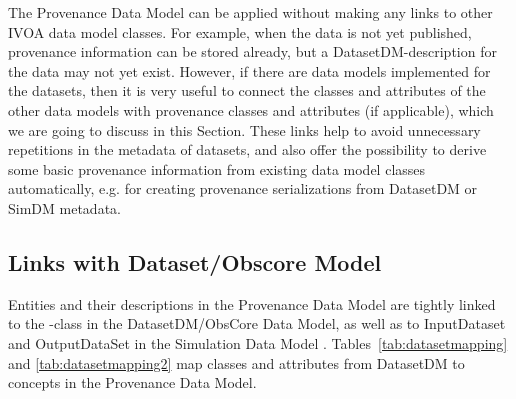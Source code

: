 
The Provenance Data Model can be applied without making any links to other 
IVOA data model classes. For example, when the data is not yet published, provenance information
can be stored already, but a DatasetDM-description for the data may not yet exist.
However, if there are data models implemented for the datasets, then it is 
very useful to connect the classes and attributes of the other data models with provenance classes and attributes (if applicable), which we are going to discuss in this Section. These links help to avoid 
unnecessary repetitions in the metadata of datasets, and also offer the possibility 
to derive some basic provenance information from existing data model classes automatically, e.g. for creating provenance serializations from DatasetDM or SimDM metadata.


\subsection{Links with Dataset/Obscore Model}
\label{sec:dataset-obscore}

Entities and their descriptions in the Provenance Data Model 
are tightly linked to the -class in the DatasetDM/ObsCore Data Model, as well as to 
InputDataset and OutputDataSet in the Simulation Data Model \citep[SimDM,][]{std:SimDM}.
Tables~\ref{tab:datasetmapping} and \ref{tab:datasetmapping2} map classes and attributes from DatasetDM
to concepts in the Provenance Data Model. 



